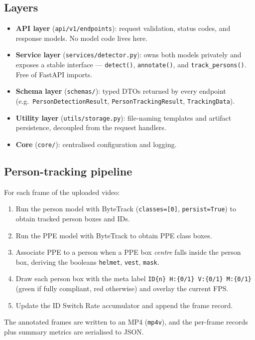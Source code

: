 \documentclass[11pt,a4paper]{article}
\begin{document}
\subsection{Layers}
\begin{itemize}
  \item \textbf{API layer} (\verb|api/v1/endpoints|): request validation,
        status codes, and response models. No model code lives here.
  \item \textbf{Service layer} (\verb|services/detector.py|): owns both models
        privately and exposes a stable interface --- \verb|detect()|,
        \verb|annotate()|, and \verb|track_persons()|. Free of FastAPI imports.
  \item \textbf{Schema layer} (\verb|schemas/|): typed DTOs returned by every
        endpoint (e.g.\ \verb|PersonDetectionResult|, \verb|PersonTrackingResult|,
        \verb|TrackingData|).
  \item \textbf{Utility layer} (\verb|utils/storage.py|): file-naming templates
        and artifact persistence, decoupled from the request handlers.
  \item \textbf{Core} (\verb|core/|): centralised configuration and logging.
\end{itemize}

\subsection{Person-tracking pipeline}
For each frame of the uploaded video:
\begin{enumerate}
  \item Run the person model with ByteTrack (\verb|classes=[0]|, \verb|persist=True|)
        to obtain tracked person boxes and IDs.
  \item Run the PPE model with ByteTrack to obtain PPE class boxes.
  \item Associate PPE to a person when a PPE box \emph{centre} falls inside the
        person box, deriving the booleans \verb|helmet|, \verb|vest|, \verb|mask|.
  \item Draw each person box with the meta label
        \verb|ID{n} H:{0/1} V:{0/1} M:{0/1}| (green if fully compliant, red
        otherwise) and overlay the current FPS.
  \item Update the ID Switch Rate accumulator and append the frame record.
\end{enumerate}
The annotated frames are written to an MP4 (\verb|mp4v|), and the per-frame
records plus summary metrics are serialised to JSON.
\end{document}
